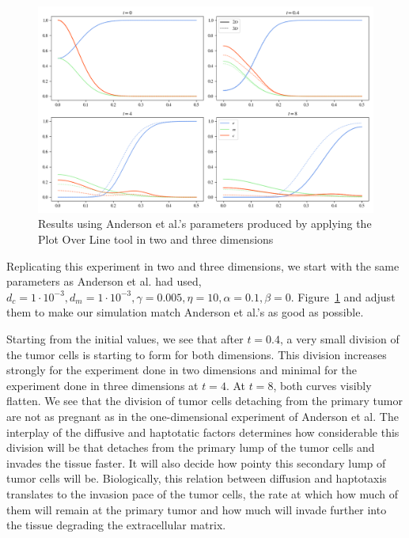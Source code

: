 \begin{figure}[ht!]
 \centering
 \includegraphics[width=\textwidth]{resources/images/1D_replication_3D.png}
 \caption{Results using Anderson et al.'s parameters produced by applying the Plot Over Line tool in two and three dimensions}
 \label{fig:unadjsuted_replication}
\end{figure}

Replicating this experiment in two and three dimensions, we start with the same parameters as Anderson et al. had used, $d_c = 1\cdot 10^{-3}, d_m = 1\cdot 10^{-3}, \gamma = 0.005, \eta = 10, \alpha = 0.1, \beta = 0$. Figure~\ref{fig:unadjsuted_replication} and adjust them to make our simulation match Anderson et al.'s as good as possible. 

Starting from the initial values, we see that after $t=0.4$, a very small division of the tumor cells is starting to form for both dimensions. This division increases strongly for the experiment done in two dimensions and minimal for the experiment done in three dimensions at $t=4$. At $t=8$, both curves visibly flatten. We see that the division of tumor cells detaching from the primary tumor are not as pregnant as in the one-dimensional experiment of Anderson et al. The interplay of the diffusive and haptotatic factors determines how considerable this division will be that detaches from the primary lump of the tumor cells and invades the tissue faster. It will also decide how pointy this secondary lump of tumor cells will be. Biologically, this relation between diffusion and haptotaxis translates to the invasion pace of the tumor cells, the rate at which how much of them will remain at the primary tumor and how much will invade further into the tissue degrading the extracellular matrix.

